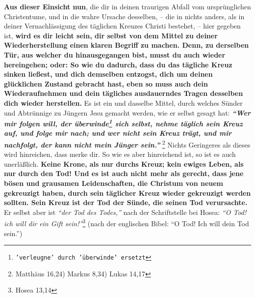 \label{ref:02_10_abhilfe} \textbf{Aus dieser Einsicht nun}, die
dir in deinen traurigen Abfall vom ursprünglichen
Christentume, und in die wahre Ursache desselben, -- die in nichts anders, als
in deiner Vernachlässigung des täglichen Kreuzes Christi bestehet, -- hier
gegeben ist, \textbf{wird es dir leicht sein, dir selbst von dem Mittel zu
deiner
Wiederherstellung einen klaren Begriff zu machen. Denn, zu derselben Tür, aus
welcher du hinausgegangen bist, musst du auch wieder hereingehen; oder: So wie
du
dadurch, dass du das tägliche Kreuz sinken ließest, und dich demselben entzogst,
dich um deinen glücklichen Zustand gebracht hast, eben so muss auch dein
Wiederaufnehmen und dein tägliches ausdauerndes Tragen desselben dich wieder
herstellen.} Es ist ein und dasselbe Mittel, durch welches Sünder und Abtrünnige
zu Jüngern Jesu gemacht werden, wie er selbst gesagt hat:
\textbf{\textit{"`Wer mir
folgen will, der überwinde\footnote{\texttt{'verleugne' durch 'überwinde'
ersetzt}}
sich selbst, nehme täglich sein Kreuz auf, und folge
mir nach; und wer nicht sein Kreuz trägt, und mir nachfolgt, der kann nicht mein
Jünger sein."'}}
\footnote{Matthäus 16,24) Markus 8,34) Lukas 14,17}
 Nichts
Geringeres als dieses wird hinreichen, dass merke dir. So wie es aber
hinreichend
ist, so ist es auch unerläßlich. \textbf{Keine Krone, als nur durchs Kreuz;
kein ewiges Leben, als nur durch den Tod!
Und es ist auch nicht mehr als gerecht, dass jene
bösen und grausamen Leidenschaften, die Christum von neuem gekreuzigt haben,
durch sein täglicher Kreuz wieder gekreuzigt werden sollten. Sein Kreuz ist der
Tod der Sünde, die seinen Tod verursachte.} Er selbst aber ist
\textit{"`der Tod des Todes,"'} nach der Schriftstelle bei Hosea:
\textit{"`O Tod! ich will dir ein Gift sein!"'}\footnote{Hosea 13,14}
 (nach der englischen Bibel: "`O Tod! Ich will
dein
Tod sein."')



